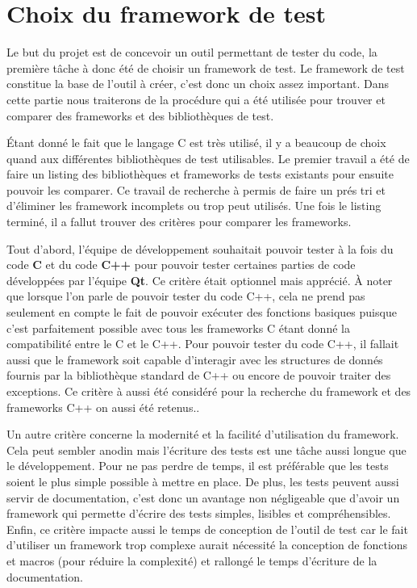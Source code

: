\documentclass[a4paper]{article}
\begin{document}
\section{Choix du framework de test}

Le but du projet est de concevoir un outil permettant de tester du code, la
première tâche à donc été de choisir un framework de test. Le framework de test
constitue la base de l'outil à créer, c'est donc un choix assez important. Dans
cette partie nous traiterons de la procédure qui a été utilisée pour trouver et
comparer des frameworks et des bibliothèques de test.

Étant donné le fait que le langage C est très utilisé, il y a beaucoup de choix
quand aux différentes bibliothèques de test utilisables. Le premier travail a
été de faire un listing des bibliothèques et frameworks de tests existants pour
ensuite pouvoir les comparer. Ce travail de recherche à permis de faire un prés
tri et d'éliminer les framework incomplets ou trop peut utilisés. Une fois le
listing terminé, il a fallut trouver des critères pour comparer les frameworks.

Tout d'abord, l'équipe de développement souhaitait pouvoir tester à la fois du
code \textbf{C} et du code \textbf{C++} pour pouvoir tester certaines parties de
code développées par l'équipe \textbf{Qt}. Ce critère était optionnel mais
apprécié. À noter que lorsque l'on parle de pouvoir tester du code C++, cela ne
prend pas seulement en compte le fait de pouvoir exécuter des fonctions basiques
puisque c'est parfaitement possible avec tous les frameworks C étant donné la
compatibilité entre le C et le C++. Pour pouvoir tester du code C++, il fallait
aussi que le framework soit capable d'interagir avec les structures de donnés
fournis par la bibliothèque standard de C++ ou encore de pouvoir traiter des
exceptions. Ce critère à aussi été considéré pour la recherche du framework et
des frameworks C++ on aussi été retenus..

Un autre critère concerne la modernité et la facilité d'utilisation du
framework. Cela peut sembler anodin mais l'écriture des tests est une tâche
aussi longue que le développement. Pour ne pas perdre de temps, il est
préférable que les tests soient le plus simple possible à mettre en place. De
plus, les tests peuvent aussi servir de documentation, c'est donc un avantage
non négligeable que d'avoir un framework qui permette d'écrire des tests
simples, lisibles et compréhensibles. Enfin, ce critère impacte aussi le temps
de conception de l'outil de test car le fait d'utiliser un framework trop
complexe aurait nécessité la conception de fonctions et macros (pour réduire la
complexité) et rallongé le temps d'écriture de la documentation.
\end{document}
